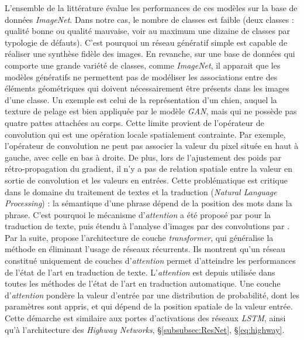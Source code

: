 L'ensemble de la littérature évalue les performances de ces modèles sur la base de données \textit{ImageNet}.
Dans notre cas, le nombre de classes est faible (deux classes : qualité bonne ou qualité mauvaise, voir au maximum une dizaine de classes par typologie de défauts).
C'est pourquoi un réseau génératif simple est capable de réaliser une synthèse fidèle des images.
En revanche, sur une base de données qui comporte une grande variété de classes, comme \textit{ImageNet}, il apparait que les modèles génératifs ne permettent pas de modéliser les associations entre des éléments géométriques qui doivent nécessairement être présents dans les images d'une classe.
Un exemple est celui de la représentation d'un chien, auquel la texture de pelage est bien appliquée par le modèle \textit{GAN}, mais qui ne possède pas quatre pattes attachées au corps.
Cette limite provient de l'opérateur de convolution qui est une opération locale spatialement contrainte.
Par exemple, l'opérateur de convolution ne peut pas associer la valeur du pixel située en haut à gauche, avec celle en bas à droite.
De plus, lors de l'ajustement des poids par rétro-propagation du gradient, il n'y a pas de relation spatiale entre la valeur en sortie de convolution et les valeurs en entrées.
Cette problématique est critique dans le domaine du traitement de textes et la traduction (\textit{Natural Language Processing}) : la sémantique d'une phrase dépend de la position des mots dans la phrase.
C'est pourquoi le mécanisme d'\textit{attention} a été proposé par \cite{bahdanau_neural_2014} pour la traduction de texte, puis étendu à l'analyse d'images par des convolutions par \cite{xu_show_2015}.
Par la suite, \cite{vaswani_attention_2017} propose l'architecture de couche \textit{transformer}, qui généralise la méthode en éliminant l'usage de réseaux récurrents.
Ils montrent qu'un réseau constitué uniquement de couches d'\textit{attention} permet d'atteindre les performances de l'état de l'art en traduction de texte.
L'\textit{attention} est depuis utilisée dans toutes les méthodes de l'état de l'art en traduction automatique.
Une couche d'\textit{attention} pondère la valeur d'entrée par une distribution de probabilité, dont les paramètres sont appris, et qui dépend de la position spatiale de la valeur entrée.
Cette démarche est similaire aux portes d'activations des réseaux \textit{LSTM}, ainsi qu'à l'architecture des \textit{Highway Networks}, §\ref{subsubsec:ResNet}, §\ref{eq:highway}.

